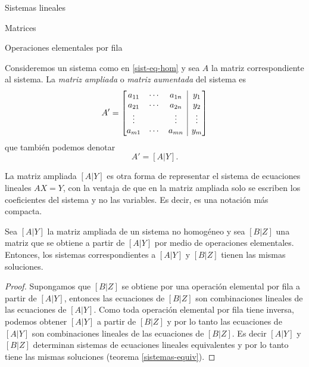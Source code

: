 \begin{chapter}{Sistemas lineales}
\begin{section}{Matrices}
\begin{subsection}{Operaciones elementales por fila}
                \begin{definicion}
                    Consideremos un sistema como en \eqref{sist-eq-hom} y sea  $A$ la matriz correspondiente al sistema. La \textit{matriz  ampliada} o  \textit{matriz  aumentada} del sistema es 
                    \begin{equation}\label{mtrx-ampliada}
                    A' = \left[\begin{array}{@{}*{3}{c}|c@{}}
                    a_{11} & \cdots & a_{1n} &  y_1 \\
                    a_{21} & \cdots & a_{2n} &  y_2 \\
                    \vdots &  & \vdots  &  \vdots  \\
                    a_{m1} & \cdots & a_{mn} &  y_m 
                    \end{array}\right]
                    \end{equation}
                    que también podemos denotar
                    \begin{equation*}
                    A' = [A | Y].
                    \end{equation*}
                \end{definicion}
                
                La matriz ampliada $[A | Y]$ es otra forma de representar el sistema de ecuaciones lineales $AX=Y$, con la ventaja de que en la matriz ampliada solo se escriben los coeficientes del sistema y no las variables. Es decir,  es una notación más compacta. 
                
                \begin{teorema}\label{th-equiv-op-elem} Sea $[A | Y]$ la matriz ampliada de un sistema no homogéneo y sea $[B | Z]$ una matriz que se obtiene a partir de $[A | Y]$ por medio de operaciones elementales. Entonces, los sistemas correspondientes a $[A | Y]$ y  $[B | Z]$ tienen las mismas soluciones. 
            \end{teorema}
            \begin{proof}
                 Supongamos que $[B | Z]$ se obtiene por una operación elemental por fila a partir de $[A | Y]$,  entonces las ecuaciones de $[B | Z]$ son combinaciones lineales de las ecuaciones de $[A | Y]$. Como toda operación elemental por fila tiene inversa, podemos obtener $[A | Y]$ a partir de $[B | Z]$ y por lo tanto las ecuaciones de $[A | Y]$ son combinaciones lineales de las ecuaciones de $[B | Z]$. Es decir $[A | Y]$ y $[B | Z]$ determinan sistemas de ecuaciones lineales equivalentes y por lo tanto tiene las mismas soluciones (teorema \ref{sistemas-equiv}).
                 

\end{proof}
\end{subsection}
\end{section}
\end{chapter}
